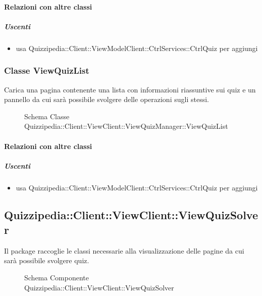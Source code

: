 \paragraph{Relazioni con altre classi}
\subparagraph{Uscenti}
\begin{itemize}
\item usa Quizzipedia::Client::ViewModelClient::CtrlServices::CtrlQuiz per aggiungi
\end{itemize}
\subsubsection{Classe ViewQuizList}
Carica una pagina contenente una lista con informazioni riassuntive sui quiz e un pannello da cui sarà possibile svolgere delle operazioni sugli stessi.
\begin{figure}[H]
\centering
\noindent{}
\caption[Schema Classe ViewQuizList]{Schema Classe Quizzipedia::Client::ViewClient::ViewQuizManager::ViewQuizList}
\end{figure}
\paragraph{Relazioni con altre classi}
\subparagraph{Uscenti}
\begin{itemize}
\item usa Quizzipedia::Client::ViewModelClient::CtrlServices::CtrlQuiz per aggiungi
\end{itemize}
\subsection{Quizzipedia::Client::ViewClient::ViewQuizSolver}
Il package raccoglie le classi necessarie alla visualizzazione delle pagine da cui sarà possibile svolgere quiz.
\begin{figure}[H]
\centering
\noindent{}
\caption[Schema Componente Quizzipedia::Client::ViewClient::ViewQuizSolver]{Schema Componente Quizzipedia::Client::ViewClient::ViewQuizSolver}
\end{figure}
